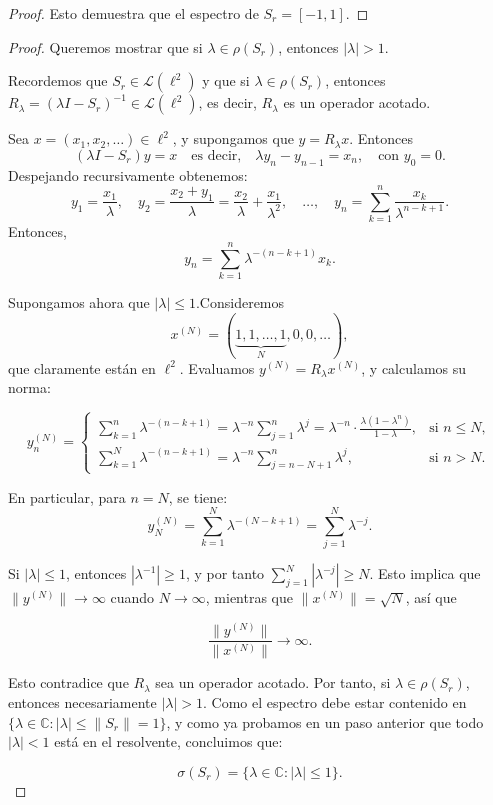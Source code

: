 \begin{enumerate}
\begin{proof}
Esto demuestra que el espectro de $S_r=[-1,1]$.
    \end{proof}
    \begin{proof}
        Queremos mostrar que si \( \lambda \in \rho(S_r) \), entonces \( |\lambda| > 1 \).

Recordemos que \( S_r \in \mathcal{L}(\ell^2) \) y que si \( \lambda \in \rho(S_r) \), entonces \( R_\lambda = (\lambda I - S_r)^{-1} \in \mathcal{L}(\ell^2) \), es decir, \( R_\lambda \) es un operador acotado.

Sea \( x = (x_1, x_2, \dots) \in \ell^2 \), y supongamos que \( y = R_\lambda x \). Entonces
\[
(\lambda I - S_r)y = x \quad \text{es decir,} \quad \lambda y_n - y_{n-1} = x_n, \quad \text{con } y_0 = 0.
\]
Despejando recursivamente obtenemos:
\[
y_1 = \frac{x_1}{\lambda}, \quad y_2 = \frac{x_2 + y_1}{\lambda} = \frac{x_2}{\lambda} + \frac{x_1}{\lambda^2}, \quad \dots, \quad y_n = \sum_{k=1}^n \frac{x_k}{\lambda^{n - k + 1}}.
\]
Entonces, 
\[
y_n = \sum_{k=1}^n \lambda^{-(n - k + 1)} x_k.
\]

Supongamos ahora que \( |\lambda| \leq 1 \).Consideremos 
\[
x^{(N)} = (\underbrace{1, 1, \dots, 1}_N, 0, 0, \dots),
\]
que claramente están en \( \ell^2 \). Evaluamos \( y^{(N)} = R_\lambda x^{(N)} \), y calculamos su norma:

\[
y_n^{(N)} = \begin{cases}
\sum_{k=1}^n \lambda^{-(n - k + 1)} = \lambda^{-n} \sum_{j=1}^{n} \lambda^j = \lambda^{-n} \cdot \frac{\lambda(1 - \lambda^n)}{1 - \lambda}, & \text{si } n \leq N, \\
\sum_{k=1}^N \lambda^{-(n - k + 1)} = \lambda^{-n} \sum_{j=n - N + 1}^{n} \lambda^j, & \text{si } n > N.
\end{cases}
\]

En particular, para \( n = N \), se tiene:
\[
y_N^{(N)} = \sum_{k=1}^{N} \lambda^{-(N - k + 1)} = \sum_{j=1}^{N} \lambda^{-j}.
\]

Si \( |\lambda| \leq 1 \), entonces \( |\lambda^{-1}| \geq 1 \), y por tanto \( \sum_{j=1}^{N} |\lambda^{-j}| \geq N \). Esto implica que \( \| y^{(N)} \| \to \infty \) cuando \( N \to \infty \), mientras que \( \| x^{(N)} \| = \sqrt{N} \), así que

\[
\frac{\| y^{(N)} \|}{\| x^{(N)} \|} \to \infty.
\]

Esto contradice que \( R_\lambda \) sea un operador acotado. Por tanto, si \( \lambda \in \rho(S_r) \), entonces necesariamente \( |\lambda| > 1 \). Como el espectro debe estar contenido en \( \{ \lambda \in \mathbb{C} : |\lambda| \leq \|S_r\|=1 \} \), y como ya probamos en un paso anterior que todo \( |\lambda| < 1 \) está en el resolvente, concluimos que:

\[
\sigma(S_r) = \{ \lambda \in \mathbb{C} : |\lambda| \leq 1 \}.
\]

    \end{proof}
\end{enumerate}




